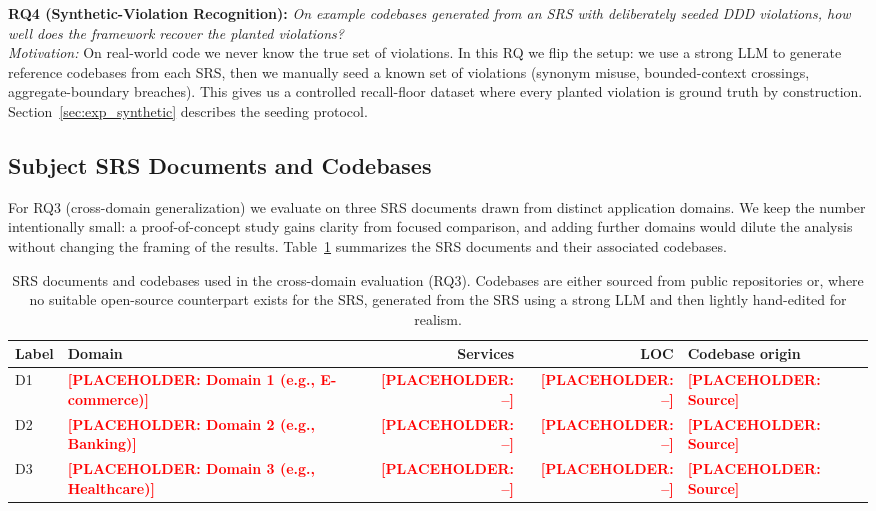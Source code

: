 \documentclass[smallextended]{svjour3}
\newcommand{\placeholder}[1]{\textcolor{red}{\textbf{[PLACEHOLDER: #1]}}}
\begin{document}
\textbf{RQ4 (Synthetic-Violation Recognition):} \emph{On example codebases generated from an SRS with deliberately seeded DDD violations, how well does the framework recover the planted violations?}
\\
\textit{Motivation:} On real-world code we never know the true set of violations.
In this RQ we flip the setup: we use a strong LLM to generate reference codebases from each SRS, then we manually seed a known set of violations (synonym misuse, bounded-context crossings, aggregate-boundary breaches).
This gives us a controlled recall-floor dataset where every planted violation is ground truth by construction.
Section~\ref{sec:exp_synthetic} describes the seeding protocol.

\subsection{Subject SRS Documents and Codebases}
\label{sec:exp_subjects}

For RQ3 (cross-domain generalization) we evaluate on three SRS documents drawn from distinct application domains.
We keep the number intentionally small: a proof-of-concept study gains clarity from focused comparison, and adding further domains would dilute the analysis without changing the framing of the results.
Table~\ref{tab:subjects} summarizes the SRS documents and their associated codebases.

\begin{table}[t]
\caption{SRS documents and codebases used in the cross-domain evaluation (RQ3). Codebases are either sourced from public repositories or, where no suitable open-source counterpart exists for the SRS, generated from the SRS using a strong LLM and then lightly hand-edited for realism.}
\label{tab:subjects}
\centering
\begin{tabular}{l l r r l}
\toprule
\textbf{Label} & \textbf{Domain} & \textbf{Services} & \textbf{LOC} & \textbf{Codebase origin} \\
\midrule
D1 & \placeholder{Domain 1 (e.g., E-commerce)} & \placeholder{--} & \placeholder{--} & \placeholder{Source} \\
D2 & \placeholder{Domain 2 (e.g., Banking)} & \placeholder{--} & \placeholder{--} & \placeholder{Source} \\
D3 & \placeholder{Domain 3 (e.g., Healthcare)} & \placeholder{--} & \placeholder{--} & \placeholder{Source} \\
\bottomrule
\end{tabular}
\end{table}
\end{document}
